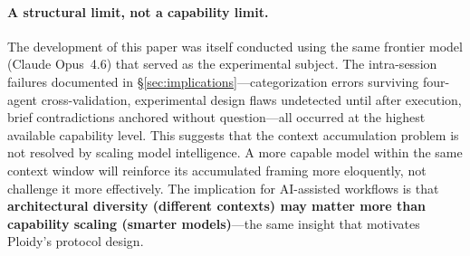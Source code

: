 \documentclass[11pt]{article}
\begin{document}
\paragraph{A structural limit, not a capability limit.}
The development of this paper was itself conducted using the same frontier model (Claude Opus~4.6) that served as the experimental subject. The intra-session failures documented in \S\ref{sec:implications}---categorization errors surviving four-agent cross-validation, experimental design flaws undetected until after execution, brief contradictions anchored without question---all occurred at the highest available capability level. This suggests that the context accumulation problem is not resolved by scaling model intelligence. A more capable model within the same context window will reinforce its accumulated framing more eloquently, not challenge it more effectively. The implication for AI-assisted workflows is that \textbf{architectural diversity (different contexts) may matter more than capability scaling (smarter models)}---the same insight that motivates Ploidy's protocol design.
\end{document}
